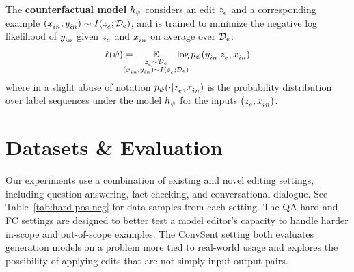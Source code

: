 \documentclass{article}
\begin{document}
The \textbf{counterfactual model} $h_\psi$ considers an edit $z_e^{}$ and a corresponding example $(x_{in}^{}, y_{in}^{})\sim I(z_e^{}; \mathcal{D}_{e})$, and is trained to minimize the negative log likelihood of $y_{in}^{}$ given $z_e^{}$ and $x_{in}^{}$ on average over $\mathcal{D}_{e}$:
\begin{equation}
\ell(\psi) = - \hspace{-8mm} \E_{\substack{\ze \sim \editdata\\
(\xtest, \ytest) \sim I(\ze; \editdata)}} \hspace{-5mm} \log p_\psi(\ytest | \ze, \xtest)
\end{equation}
where in a slight abuse of notation $p_\psi(\cdot | z_e^{}, x_{in}^{})$ is the probability distribution over label sequences under the model $h_\psi$ for the inputs $(z_e^{}, x_{in}^{})$.



\section{Datasets \& Evaluation}
\label{sec:datasets}

Our experiments use a combination of existing and novel editing settings, including question-answering, fact-checking, and conversational dialogue. See Table~\ref{tab:hard-pos-neg} for data samples from each setting. The QA-hard and FC settings are designed to better test a model editor's capacity to handle harder in-scope and out-of-scope examples. The ConvSent setting both evaluates generation models on a problem more tied to real-world usage and explores the possibility of applying edits that are not simply input-output pairs.
\end{document}
